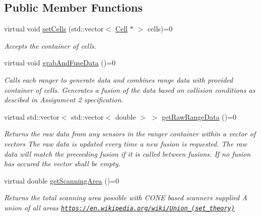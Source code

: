 \subsection*{Public Member Functions}
\begin{DoxyCompactItemize}
\item 
virtual void \hyperlink{classRangerFusionInterface_ab0b45c2c462124ce74d54eb226044beb}{set\+Cells} (std\+::vector$<$ \hyperlink{classCell}{Cell} $\ast$ $>$ cells)=0
\begin{DoxyCompactList}\small\item\em Accepts the container of cells. \end{DoxyCompactList}\item 
virtual void \hyperlink{classRangerFusionInterface_ada6afdab2ce6d58a1bd0134f5e2be23f}{grab\+And\+Fuse\+Data} ()=0\hypertarget{classRangerFusionInterface_ada6afdab2ce6d58a1bd0134f5e2be23f}{}\label{classRangerFusionInterface_ada6afdab2ce6d58a1bd0134f5e2be23f}

\begin{DoxyCompactList}\small\item\em Calls each ranger to generate data and combines range data with provided container of cells. Generates a \textquotesingle{}fusion\textquotesingle{} of the data based on collision conditions as descibed in Assignment 2 specification. \end{DoxyCompactList}\item 
virtual std\+::vector$<$ std\+::vector$<$ double $>$ $>$ \hyperlink{classRangerFusionInterface_a9d60ca5866261026b870d7c0171587f5}{get\+Raw\+Range\+Data} ()=0
\begin{DoxyCompactList}\small\item\em Returns the raw data from any sensors in the ranger container within a vector of vectors The raw data is updated every time a new fusion is requested. The raw data will match the preceeding fusion if it is called between fusions. If no fusion has occured the vector shall be empty. \end{DoxyCompactList}\item 
virtual double \hyperlink{classRangerFusionInterface_a65155605804376da4f67baf3c6f97f40}{get\+Scanning\+Area} ()=0
\begin{DoxyCompactList}\small\item\em Returns the total scanning area possible with C\+O\+NE based scanners supplied A union of all areas \href{https://en.wikipedia.org/wiki/Union_(set_theory)}{\tt https\+://en.\+wikipedia.\+org/wiki/\+Union\+\_\+(set\+\_\+theory)} \end{DoxyCompactList}\end{DoxyCompactItemize}



